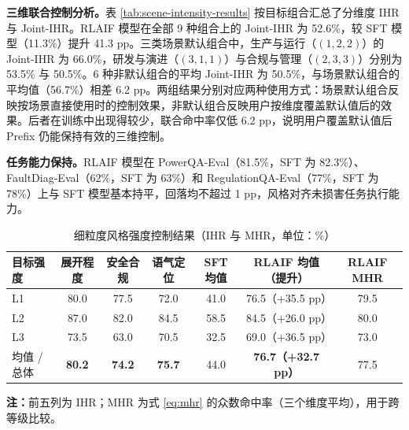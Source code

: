\documentclass[fontset=fandol,type=master,campus=shenzhen,etitleauto=true]{hithesisbook}
\begin{document}
\textbf{三维联合控制分析。}表 \ref{tab:scene-intensity-results} 按目标组合汇总了分维度 IHR 与 Joint-IHR。RLAIF 模型在全部 9 种组合上的 Joint-IHR 为 52.6\%，较 SFT 模型（11.3\%）提升 41.3 pp。三类场景默认组合中，生产与运行（$(1,2,2)$）的 Joint-IHR 为 66.0\%，研发与演进（$(3,1,1)$）与合规与管理（$(2,3,3)$）分别为 53.5\% 与 50.5\%。6 种非默认组合的平均 Joint-IHR 为 50.5\%，与场景默认组合的平均值（56.7\%）相差 6.2 pp。两组结果分别对应两种使用方式：场景默认组合反映按场景直接使用时的控制效果，非默认组合反映用户按维度覆盖默认值后的效果。后者在训练中出现得较少，联合命中率仅低 6.2 pp，说明用户覆盖默认值后 Prefix 仍能保持有效的三维控制。

\textbf{任务能力保持。}RLAIF 模型在 PowerQA-Eval（81.5\%，SFT 为 82.3\%）、FaultDiag-Eval（62\%，SFT 为 63\%）和 RegulationQA-Eval（77\%，SFT 为 78\%）上与 SFT 模型基本持平，回落均不超过 1 pp，风格对齐未损害任务执行能力。

\begin{table}[htbp]
\centering
\caption{细粒度风格强度控制结果（IHR 与 MHR，单位：\%）}
\label{tab:intensity-results}
\small
\setlength{\tabcolsep}{3pt}
\renewcommand{\arraystretch}{1.15}
\begin{tabular}{l c c c c c c}
\toprule
\textbf{目标强度} & \textbf{展开程度} & \textbf{安全合规} & \textbf{语气定位} & \textbf{SFT 均值} & \textbf{RLAIF 均值（提升）} & \textbf{RLAIF MHR} \\
\midrule
L1 & 80.0 & 77.5 & 72.0 & 41.0 & 76.5（+35.5 pp） & 79.5 \\
L2 & 87.0 & 82.0 & 84.5 & 58.5 & 84.5（+26.0 pp） & 80.0 \\
L3 & 73.5 & 63.0 & 70.5 & 32.5 & 69.0（+36.5 pp） & 73.0 \\
\midrule
均值 / 总体 & \textbf{80.2} & \textbf{74.2} & \textbf{75.7} & 44.0 & \textbf{76.7（+32.7 pp）} & 77.5 \\
\bottomrule
\end{tabular}

\vspace{0.2cm}
\parbox{\linewidth}{\small \textbf{注：}前五列为 IHR；MHR 为式 \eqref{eq:mhr} 的众数命中率（三个维度平均），用于跨等级比较。}
\end{table}
\end{document}
